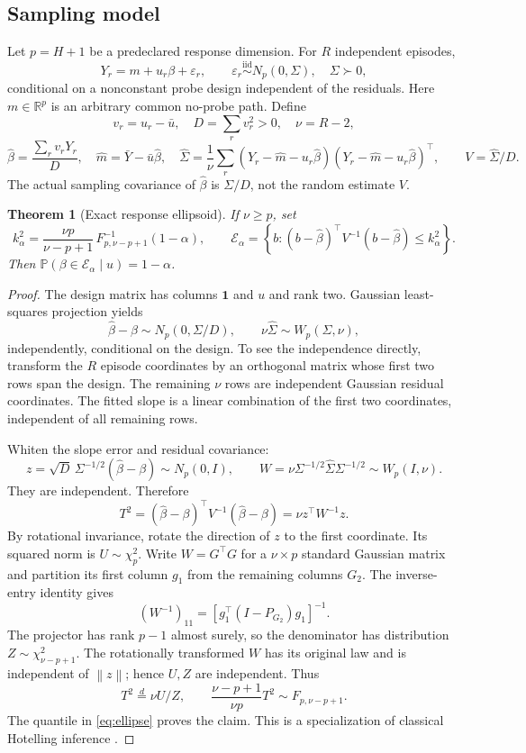\documentclass[11pt,a4paper]{article}
\newtheorem{theorem}{Theorem}[section]
\theoremstyle{definition}\newtheorem{definition}[theorem]{Definition}
\theoremstyle{remark}\newtheorem{remark}[theorem]{Remark}
\newcommand{\R}{\mathbb R}\newcommand{\E}{\mathbb E}\newcommand{\Prob}{\mathbb P}
\newcommand{\one}{\mathbf 1}\newcommand{\diag}{\operatorname{diag}}
\newcommand{\norm}[1]{\left\lVert#1\right\rVert}
\newcommand{\mc}{\mathcal}
\begin{document}
\subsection{Sampling model}
Let $p=H+1$ be a predeclared response dimension. For $R$ independent episodes,
\begin{equation}
 Y_r=m+u_r\beta+\varepsilon_r,\qquad
 \varepsilon_r\overset{\mathrm{iid}}\sim N_p(0,\Sigma),\quad\Sigma\succ0,
 \label{eq:regression}
\end{equation}
conditional on a nonconstant probe design independent of the residuals. Here $m\in\R^p$ is an arbitrary common no-probe path. Define
\[
 v_r=u_r-\bar u,\quad D=\sum_rv_r^2>0,\quad \nu=R-2,
\]
\[
 \hat\beta=\frac{\sum_rv_rY_r}{D},\quad
 \hat m=\bar Y-\bar u\hat\beta,\quad
 \hat\Sigma=\frac1\nu\sum_r(Y_r-\hat m-u_r\hat\beta)(Y_r-\hat m-u_r\hat\beta)^\top,
 \qquad V=\hat\Sigma/D.
\]
The actual sampling covariance of $\hat\beta$ is $\Sigma/D$, not the random estimate $V$.

\begin{theorem}[Exact response ellipsoid]\label{thm:ellipsoid}
If $\nu\ge p$, set
\begin{equation}
 k_\alpha^2=\frac{\nu p}{\nu-p+1}\,
 F^{-1}_{p,\nu-p+1}(1-\alpha),\qquad
 \mc E_\alpha=\left\{b:(b-\hat\beta)^\top V^{-1}(b-\hat\beta)\le k_\alpha^2\right\}.
 \label{eq:ellipse}
\end{equation}
Then $\Prob(\beta\in\mc E_\alpha\mid u)=1-\alpha$.
\end{theorem}
\begin{proof}
The design matrix has columns $\one$ and $u$ and rank two. Gaussian least-squares projection yields
\[
 \hat\beta-\beta\sim N_p(0,\Sigma/D),\qquad
 \nu\hat\Sigma\sim W_p(\Sigma,\nu),
\]
independently, conditional on the design. To see the independence directly, transform the $R$ episode coordinates by an orthogonal matrix whose first two rows span the design. The remaining $\nu$ rows are independent Gaussian residual coordinates. The fitted slope is a linear combination of the first two coordinates, independent of all remaining rows.

Whiten the slope error and residual covariance:
\[
 z=\sqrt D\,\Sigma^{-1/2}(\hat\beta-\beta)\sim N_p(0,I),\qquad
 W=\nu\Sigma^{-1/2}\hat\Sigma\Sigma^{-1/2}\sim W_p(I,\nu).
\]
They are independent. Therefore
\[
 T^2=(\hat\beta-\beta)^\top V^{-1}(\hat\beta-\beta)
 =\nu z^\top W^{-1}z.
\]
By rotational invariance, rotate the direction of $z$ to the first coordinate. Its squared norm is $U\sim\chi_p^2$. Write $W=G^\top G$ for a $\nu\times p$ standard Gaussian matrix and partition its first column $g_1$ from the remaining columns $G_2$. The inverse-entry identity gives
\[
 (W^{-1})_{11}=\left[g_1^\top(I-P_{G_2})g_1\right]^{-1}.
\]
The projector has rank $p-1$ almost surely, so the denominator has distribution $Z\sim\chi^2_{\nu-p+1}$. The rotationally transformed $W$ has its original law and is independent of $\norm z$; hence $U,Z$ are independent. Thus
\[
 T^2\overset d=\nu U/Z,
 \qquad \frac{\nu-p+1}{\nu p}T^2\sim F_{p,\nu-p+1}.
\]
The quantile in \eqref{eq:ellipse} proves the claim. This is a specialization of classical Hotelling inference \cite{hotelling,psu}.
\end{proof}
\end{document}
